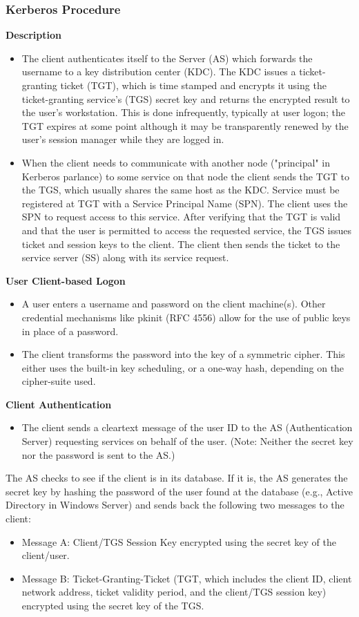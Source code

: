 \documentclass[11pt]{article}
\begin{document}
\subsubsection{Kerberos Procedure}
\label{sec:org62fe5e2}
\textbf{Description}
\begin{itemize}
\item The client authenticates itself to the Server (AS) which forwards the username to a key distribution center (KDC). The KDC issues a ticket-granting ticket (TGT), which is time stamped and encrypts it using the ticket-granting service's (TGS) secret key and returns the encrypted result to the user's workstation. This is done infrequently, typically at user logon; the TGT expires at some point although it may be transparently renewed by the user's session manager while they are logged in.
\item When the client needs to communicate with another node ("principal" in Kerberos parlance) to some service on that node the client sends the TGT to the TGS, which usually shares the same host as the KDC. Service must be registered at TGT with a Service Principal Name (SPN). The client uses the SPN to request access to this service. After verifying that the TGT is valid and that the user is permitted to access the requested service, the TGS issues ticket and session keys to the client. The client then sends the ticket to the service server (SS) along with its service request.
\end{itemize}

\textbf{User Client-based Logon}
\begin{itemize}
\item A user enters a username and password on the client machine(s). Other credential mechanisms like pkinit (RFC 4556) allow for the use of public keys in place of a password.
\item The client transforms the password into the key of a symmetric cipher. This either uses the built-in key scheduling, or a one-way hash, depending on the cipher-suite used.
\end{itemize}

\textbf{Client Authentication}
\begin{itemize}
\item The client sends a cleartext message of the user ID to the AS (Authentication Server) requesting services on behalf of the user. (Note: Neither the secret key nor the password is sent to the AS.)
\end{itemize}
The AS checks to see if the client is in its database. If it is, the AS generates the secret key by hashing the password of the user found at the database (e.g., Active Directory in Windows Server) and sends back the following two messages to the client:
\begin{itemize}
\item Message A: Client/TGS Session Key encrypted using the secret key of the client/user.
\item Message B: Ticket-Granting-Ticket (TGT, which includes the client ID, client network address, ticket validity period, and the client/TGS session key) encrypted using the secret key of the TGS.
\end{itemize}
\end{document}
